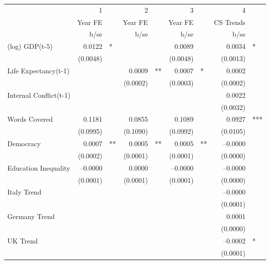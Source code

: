 \begin{tabular} {l* {4}{r @{} l}}
\hline
            &           1&   &           2&   &           3&   &           4&   \\
            &     Year FE&   &     Year FE&   &     Year FE&   &   CS Trends&   \\
            &        b/se&   &        b/se&   &        b/se&   &        b/se&   \\
\hline
(log) GDP(t-5)&      0.0122&*  &            &   &      0.0089&   &      0.0034&*  \\
            &    (0.0048)&   &            &   &    (0.0048)&   &    (0.0013)&   \\
Life Expectancy(t-1) &            &   &      0.0009&** &      0.0007&*  &      0.0002&   \\
            &            &   &    (0.0002)&   &    (0.0003)&   &    (0.0002)&   \\
Internal Conflict(t-1)&            &   &            &   &            &   &      0.0022&   \\
            &            &   &            &   &            &   &    (0.0032)&   \\
Words Covered&      0.1181&   &      0.0855&   &      0.1089&   &      0.0927&***\\
            &    (0.0995)&   &    (0.1090)&   &    (0.0992)&   &    (0.0105)&   \\
Democracy   &      0.0007&** &      0.0005&** &      0.0005&** &    --0.0000&   \\
            &    (0.0002)&   &    (0.0001)&   &    (0.0001)&   &    (0.0000)&   \\
Education Inequality&    --0.0000&   &      0.0000&   &    --0.0000&   &    --0.0000&   \\
            &    (0.0001)&   &    (0.0001)&   &    (0.0001)&   &    (0.0000)&   \\
Italy Trend &            &   &            &   &            &   &    --0.0000&   \\
            &            &   &            &   &            &   &    (0.0001)&   \\
Germany Trend&            &   &            &   &            &   &      0.0001&   \\
            &            &   &            &   &            &   &    (0.0000)&   \\
UK Trend    &            &   &            &   &            &   &    --0.0002&*  \\
            &            &   &            &   &            &   &    (0.0001)&   \\

\end{tabular}
